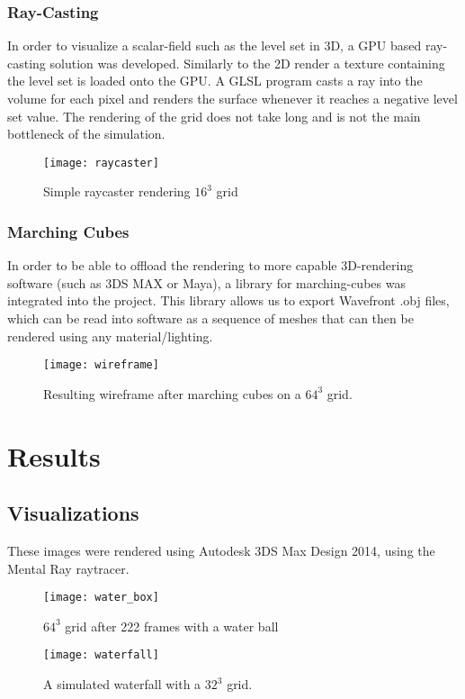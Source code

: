 \documentclass[twocolumn]{article}
\begin{document}
\subsubsection{Ray-Casting}
In order to visualize a scalar-field such as the level set in 3D, a GPU based ray-casting solution was developed. Similarly to the 2D render a texture containing the level set is loaded onto the GPU. A GLSL program casts a ray into the volume for each pixel and renders the surface whenever it reaches a negative level set value. The rendering of the grid does not take long and is not the main bottleneck of the simulation.

\begin{figure}[H]
  \centering
    \texttt{[image: raycaster]}
  \caption{Simple raycaster rendering $16^3$ grid }
  \label{fig:raycaster}
\end{figure}

\subsubsection{Marching Cubes}
In order to be able to offload the rendering to more capable 3D-rendering software (such as 3DS MAX or Maya), a library for marching-cubes was integrated into the project. This library allows us to export Wavefront .obj files, which can be read into software as a sequence of meshes that can then be rendered using any material/lighting.

\begin{figure}[H]
  \centering
    \texttt{[image: wireframe]}
  \caption{Resulting wireframe after marching cubes on a $64^3$ grid.}
  \label{fig:wireframe}
\end{figure}

\section{Results} 
\subsection{Visualizations}
These images were rendered using Autodesk 3DS Max Design 2014, using the Mental Ray raytracer.
\begin{figure}[H]
  \centering
    \texttt{[image: water\_box]}
  \caption{$64^3$ grid after 222 frames with a water ball}
  \label{fig:watergrid}
\end{figure}
\begin{figure}[H]
  \centering
    \texttt{[image: waterfall]}
  \caption{A simulated waterfall with a $32^3$ grid.}
  \label{fig:waterfall}
\end{figure}
\end{document}
